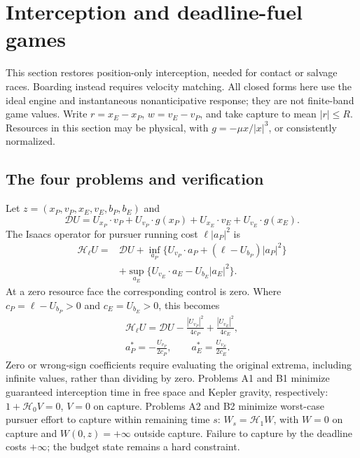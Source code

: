 \section{Interception and deadline-fuel games}
\label{sec:interception}
This section restores position-only interception, needed for contact or
salvage races. Boarding instead requires velocity matching. All closed
forms here use the ideal engine and instantaneous nonanticipative response;
they are not finite-band game values. Write $r=x_E-x_P$, $w=v_E-v_P$,
and take capture to mean $|r|\le R$. Resources in this section may be
physical, with $g=-\mu x/|x|^3$, or consistently normalized.

\subsection{The four problems and verification}
Let $z=(x_P,v_P,x_E,v_E,b_P,b_E)$ and
\[
 \mathcal D U=U_{x_P}\cdot v_P+U_{v_P}\cdot g(x_P)
              +U_{x_E}\cdot v_E+U_{v_E}\cdot g(x_E).
\]
The Isaacs operator for pursuer running cost $\ell|a_P|^2$ is
\begin{equation}
\begin{split}
\mathcal H_\ell U={}&\mathcal D U+
 \inf_{a_P}\{U_{v_P}\cdot a_P+(\ell-U_{b_P})|a_P|^2\}\\
 &+\sup_{a_E}\{U_{v_E}\cdot a_E-U_{b_E}|a_E|^2\}.
\end{split}
\end{equation}
At a zero resource face the corresponding control is zero. Where
$c_P=\ell-U_{b_P}>0$ and $c_E=U_{b_E}>0$, this becomes
\begin{equation}
 \begin{gathered}
 \mathcal H_\ell U=\mathcal D U-
 \frac{|U_{v_P}|^2}{4c_P}+\frac{|U_{v_E}|^2}{4c_E},\\
 a_P^*=-\frac{U_{v_P}}{2c_P},\qquad a_E^*=\frac{U_{v_E}}{2c_E}.
 \end{gathered}
\end{equation}
Zero or wrong-sign coefficients require evaluating the original extrema,
including infinite values, rather than dividing by zero.
Problems A1 and B1 minimize guaranteed interception time in free space
and Kepler gravity, respectively: $1+\mathcal H_0V=0$, $V=0$ on capture.
Problems A2 and B2 minimize worst-case pursuer effort to capture within
remaining time $s$: $W_s=\mathcal H_1W$, with $W=0$ on capture and
$W(0,z)=+\infty$ outside capture. Failure to capture by the deadline costs
$+\infty$; the budget state remains a hard constraint.

